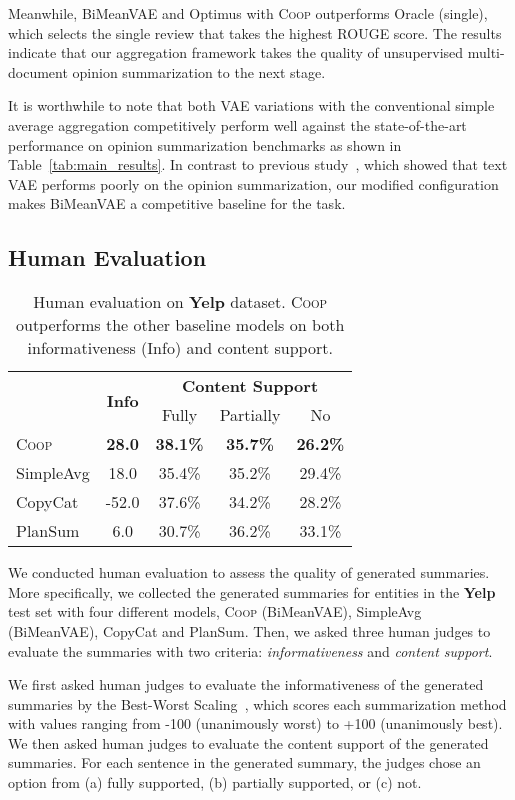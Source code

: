 \documentclass[11pt]{article}
\newcommand{\aggname}{\textsc{Coop}}
\newcommand{\name}{\mbox{\sc BiMeanVAE}}
\newcommand{\simpleavg}{\mbox{SimpleAvg}}
\newcommand{\yelp}{\mbox{\bf Yelp}}
\begin{document}
Meanwhile, \name{} and Optimus with \aggname{} outperforms Oracle (single), which selects the single review that takes the highest ROUGE score. The results indicate that our aggregation framework takes the quality of unsupervised multi-document opinion summarization to the next stage.

It is worthwhile to note that both VAE variations with the conventional simple average aggregation competitively perform well against the state-of-the-art performance on opinion summarization benchmarks as shown in Table~\ref{tab:main_results}. In contrast to previous study~\cite{brazinskas-etal-2020-unsupervised}, which showed that text VAE performs poorly on the opinion summarization, our modified configuration makes \name{} a competitive baseline for the task.

\subsection{Human Evaluation}
\begin{table}[t]
\small
    \centering
    \begin{tabular}{l|c|ccc}
    \toprule
    &\multirow{2}{*}{{\bf Info}} & \multicolumn{3}{c}{\bf Content Support} \\
    &  & Fully & Partially & No \\ \midrule
    \aggname{} & {\bf 28.0} & {\bf 38.1\%}	& {\bf 35.7\%} & {\bf 26.2\%}\\
    \simpleavg & 18.0 & 35.4\% & 35.2\% & 29.4\%\\
    CopyCat & -52.0 & 37.6\% & 34.2\% & 28.2\%\\
    PlanSum & 6.0 & 30.7\% &	36.2\% & 33.1\% \\
    \bottomrule
    \end{tabular}
    \caption{Human evaluation on \yelp{} dataset. \aggname{} outperforms the other baseline models on both informativeness (Info) and content support. }
    \label{tab:human}
\end{table}
We conducted human evaluation to assess the quality of generated summaries. More specifically, we collected the generated summaries for entities in the \yelp{} test set with four different models,  \aggname{} (\name), \simpleavg{} (\name), CopyCat and PlanSum. Then, we asked three human judges to evaluate the summaries with two criteria: {\em informativeness} and {\em content support}. 

We first asked
human judges to evaluate the informativeness of the generated summaries by the Best-Worst Scaling~\cite{louviere2015best}, which scores each summarization method
with values ranging from -100 (unanimously worst) to +100 (unanimously best). We then asked human judges to evaluate the content support of the generated summaries. For each sentence in the generated summary, the judges chose an option from (a) fully supported, (b) partially supported, or (c) not.
\end{document}
